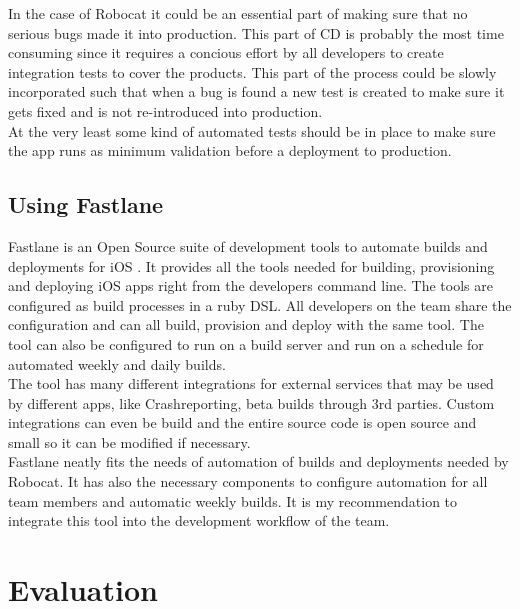 \documentclass{ituthesis}
\begin{document}
In the case of Robocat it could be an essential part of making sure that no serious bugs made it into production. This part of CD is probably the most time consuming since it requires a concious effort by all developers to create integration tests to cover the products. This part of the process could be slowly incorporated such that when a bug is found a new test is created to make sure it gets fixed and is not re-introduced into production.\\

At the very least some kind of automated tests should be in place to make sure the app runs as minimum validation before a deployment to production.

\section{Using Fastlane}
\label{sec:using_fastlane}

Fastlane is an Open Source suite of development tools to automate builds and deployments for iOS \cite{Krause2015}. It provides all the tools needed for building, provisioning and deploying iOS apps right from the developers command line. The tools are configured as build processes in a ruby DSL. All developers on the team share the configuration and can all build, provision and deploy with the same tool. The tool can also be configured to run on a build server and run on a schedule for automated weekly and daily builds.\\

The tool has many different integrations for external services that may be used by different apps, like Crashreporting, beta builds through 3rd parties. Custom integrations can even be build and the entire source code is open source and small so it can be modified if necessary.\\

Fastlane neatly fits the needs of automation of builds and deployments needed by Robocat. It has also the necessary components to configure automation for all team members and automatic weekly builds. It is my recommendation to integrate this tool into the development workflow of the team.

\chapter{Evaluation}
\label{ch:evaluation}
\end{document}
